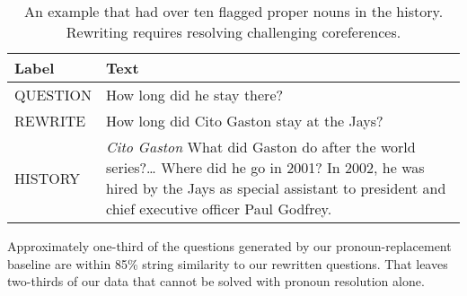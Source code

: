  
\begin{table}
	\small
	\begin{tabular*}{\linewidth}{l p{5cm}}
          		\toprule
		{\bf Label} & {\bf Text} \\
          \hline
          QUESTION & How long did he stay there? \\
          \rowcolor{gray!25}
		REWRITE  & How long did Cito Gaston stay at the Jays? \\
		HISTORY & \parbox{5 cm}{\textit{Cito Gaston}
                            What did Gaston do after the world series?\newline \dots {} Where did he go in 2001?   In 2002, he was hired by the Jays as special assistant to president and chief executive officer Paul Godfrey.} \\
		\bottomrule
	\end{tabular*}
	\caption{An example that had over ten flagged proper nouns in the history. Rewriting requires resolving challenging coreferences.}
	  
	\label{tab:coreferenceexample}
\end{table}



Approximately one-third of the questions generated by our
pronoun-replacement baseline are within 85\% string similarity to our
rewritten questions.
That leaves two-thirds of our data that cannot be solved with pronoun resolution alone. 


